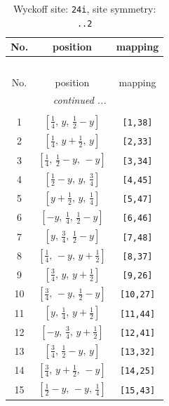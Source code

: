 \documentclass[fleqn,8pt]{jsarticle}
\begin{document}
\begin{longtable}{ccc}
\caption{Wyckoff site: {\tt 24i}, site symmetry: {\tt ..2}}
 \\
 \hline \hline
No. & position & mapping \\ \hline \endfirsthead

\multicolumn{2}{l}{\tablename\ \thetable{}} \\
 \hline \hline
No. & position & mapping \\ \hline \endhead

 \hline \hline
\multicolumn{2}{r}{\footnotesize\it continued ...} \\ \endfoot

 \hline \hline
\multicolumn{2}{r}{} \\ \endlastfoot

1 & $\left[ \frac{1}{4},\, y,\, \frac{1}{2} - y \right]$ & {\tt [1,38]} \\ \hline
2 & $\left[ \frac{1}{4},\, y + \frac{1}{2},\, y \right]$ & {\tt [2,33]} \\ \hline
3 & $\left[ \frac{1}{4},\, \frac{1}{2} - y,\, - y \right]$ & {\tt [3,34]} \\ \hline
4 & $\left[ \frac{1}{2} - y,\, y,\, \frac{3}{4} \right]$ & {\tt [4,45]} \\ \hline
5 & $\left[ y + \frac{1}{2},\, y,\, \frac{1}{4} \right]$ & {\tt [5,47]} \\ \hline
6 & $\left[ - y,\, \frac{1}{4},\, \frac{1}{2} - y \right]$ & {\tt [6,46]} \\ \hline
7 & $\left[ y,\, \frac{3}{4},\, \frac{1}{2} - y \right]$ & {\tt [7,48]} \\ \hline
8 & $\left[ \frac{1}{4},\, - y,\, y + \frac{1}{2} \right]$ & {\tt [8,37]} \\ \hline
9 & $\left[ \frac{3}{4},\, y,\, y + \frac{1}{2} \right]$ & {\tt [9,26]} \\ \hline
10 & $\left[ \frac{3}{4},\, - y,\, \frac{1}{2} - y \right]$ & {\tt [10,27]} \\ \hline
11 & $\left[ y,\, \frac{1}{4},\, y + \frac{1}{2} \right]$ & {\tt [11,44]} \\ \hline
12 & $\left[ - y,\, \frac{3}{4},\, y + \frac{1}{2} \right]$ & {\tt [12,41]} \\ \hline
13 & $\left[ \frac{3}{4},\, \frac{1}{2} - y,\, y \right]$ & {\tt [13,32]} \\ \hline
14 & $\left[ \frac{3}{4},\, y + \frac{1}{2},\, - y \right]$ & {\tt [14,25]} \\ \hline
15 & $\left[ \frac{1}{2} - y,\, - y,\, \frac{1}{4} \right]$ & {\tt [15,43]} \\ \hline

\end{longtable}
\end{document}
